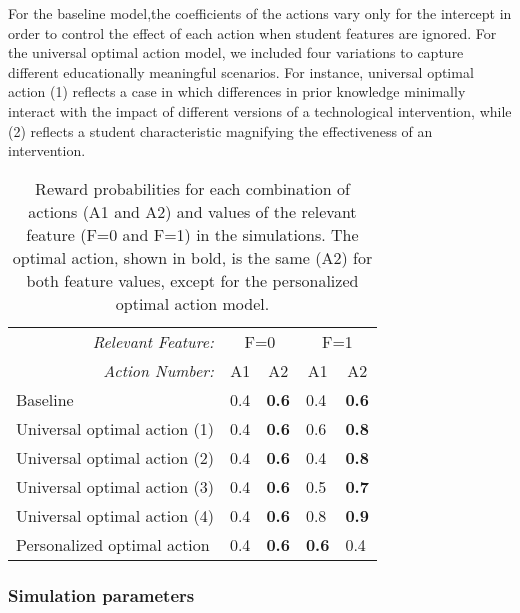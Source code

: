 For the baseline model,the coefficients of the actions vary only for the intercept in order to control the effect of each action when student features are ignored. For the universal optimal action model, we included four variations to capture different educationally meaningful scenarios. For instance, universal optimal action (1) reflects a case in which differences in prior knowledge minimally interact with the impact of different versions of a technological intervention, while (2) reflects a student characteristic magnifying the effectiveness of an intervention. 

\begin{table}[t]

\begin{tabular*}{\columnwidth}{@{\extracolsep{\fill}}lllll}
\toprule
\multicolumn{1}{r}{\textit{Relevant Feature:}}   & \multicolumn{2}{c}{F=0}         & \multicolumn{2}{c}{F=1}      \\
\multicolumn{1}{r}{\textit{Action Number:}}         & \multicolumn{1}{c}{A1} & \multicolumn{1}{c}{A2} & \multicolumn{1}{c}{A1} & \multicolumn{1}{c}{A2} \\
\midrule
Baseline     & 0.4     & \textbf{0.6}     & 0.4     & \textbf{0.6}     \\
Universal optimal action (1) & 0.4     & \textbf{0.6}     & 0.6     & \textbf{0.8}    \\
Universal optimal action (2) & 0.4     & \textbf{0.6}     & 0.4     & \textbf{0.8}\\
Universal optimal action (3) & 0.4     & \textbf{0.6}     & 0.5     & \textbf{0.7}\\
Universal optimal action (4) & 0.4     & \textbf{0.6}     & 0.8     & \textbf{0.9}     \\
Personalized optimal action  & 0.4     & \textbf{0.6}     & \textbf{0.6}     & 0.4    \\
\bottomrule
\end{tabular*}
\caption{Reward probabilities for each combination of actions (A1 and A2) and values of the relevant feature (F=0 and F=1) in the simulations. The optimal action, shown in bold, is the same (A2) for both feature values, except for the personalized optimal action model.}\label{table:rewardProb}
\end{table}

\subsubsection{Simulation parameters}

